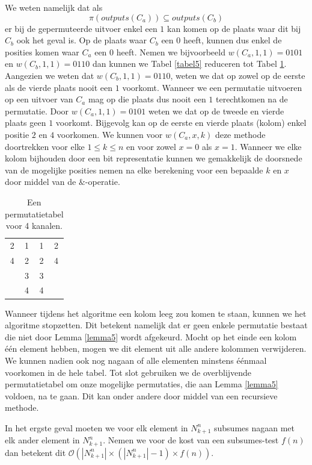 \documentclass{article}
\begin{document}
We weten namelijk dat als \[{\pi\left(outputs\left(C_a\right)\right) \subseteq outputs\left(C_b\right)}\] er bij de gepermuteerde uitvoer enkel een $1$ kan komen op de plaats waar dit bij $C_b$ ook het geval is.
Op de plaats waar $C_b$ een $0$ heeft, kunnen dus enkel de posities komen waar $C_a$ een $0$ heeft.
Nemen we bijvoorbeeld $w\left(C_a,1,1\right) = 0101$ en ${w\left(C_b,1,1\right)=0110}$ dan kunnen we Tabel \ref{tabel5} reduceren tot Tabel \ref{tabel6}.
Aangezien we weten dat $w\left(C_b,1,1\right) = 0110$, weten we dat op zowel op de eerste als de vierde plaats nooit een $1$ voorkomt.
Wanneer we een permutatie uitvoeren op een uitvoer van $C_a$ mag op die plaats dus nooit een $1$ terechtkomen na de permutatie.
Door $w\left(C_a,1,1\right) = 0101$ weten we dat op de tweede en vierde plaats geen $1$ voorkomt.
Bijgevolg kan op de eerste en vierde plaats (kolom) enkel positie $2$ en $4$ voorkomen.
We kunnen voor $w\left(C_a, x, k\right)$ deze methode doortrekken voor elke $1 \leq k \leq n$ en voor zowel $x = 0$ als $x = 1$.
Wanneer we elke kolom bijhouden door een bit representatie kunnen we gemakkelijk de doorsnede van de mogelijke posities nemen na elke berekening voor een bepaalde $k$ en $x$ door middel van de $\&$-operatie. 
\begin{table}[!h]
	\centering
	\begin{tabular}{|c|c|c|c|}
	\hline
	2 & 1 & 1 & 2 \\ 
	4 & 2 & 2 & 4\\ 
	 & 3 & 3 &  \\
	 & 4 & 4 & \\ 
	\hline 
	\end{tabular}
	\caption{Een permutatietabel voor 4 kanalen.}
	\label{tabel6}
\end{table}

Wanneer tijdens het algoritme een kolom leeg zou komen te staan, kunnen we het algoritme stopzetten.
Dit betekent namelijk dat er geen enkele permutatie bestaat die niet door Lemma \ref{lemma5} wordt afgekeurd.
Mocht op het einde een kolom \'e\'en element hebben, mogen we dit element uit alle andere kolommen verwijderen.
We kunnen nadien ook nog nagaan of alle elementen minstens \'e\'enmaal voorkomen in de hele tabel.
Tot slot gebruiken we de overblijvende permutatietabel om onze mogelijke permutaties, die aan Lemma \ref{lemma5} voldoen, na te gaan. 
Dit kan onder andere door middel van een recursieve methode.

In het ergste geval moeten we voor elk element in $N^n_{k+1}$ subsumes nagaan met elk ander element in $N^n_{k+1}$.
Nemen we voor de kost van een subsumes-test $f(n)$ dan betekent dit $\mathcal{O}\left(|N^n_{k+1}| \times \left(|N^n_{k+1}|-1\right) \times f(n) \right) $.
\end{document}
